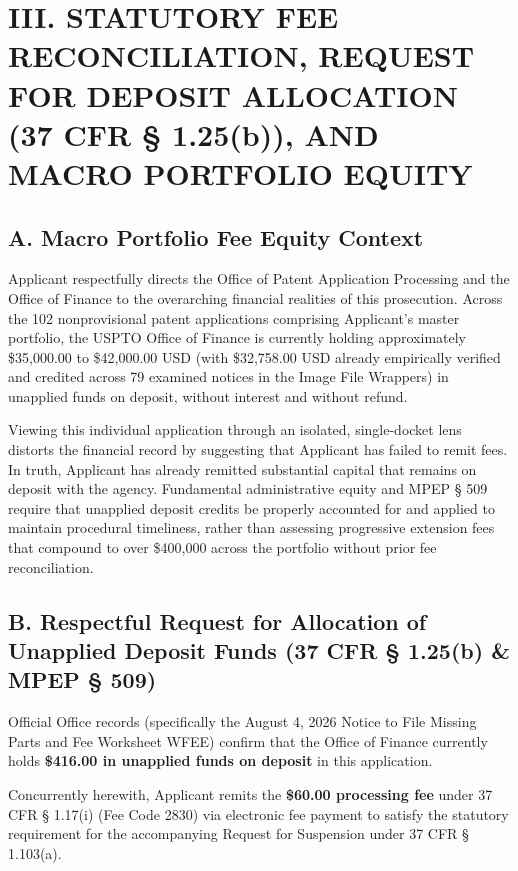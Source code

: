 \documentclass[11pt,letterpaper]{article}
\begin{document}
\section*{III. STATUTORY FEE RECONCILIATION, REQUEST FOR DEPOSIT ALLOCATION (37 CFR \S{} 1.25(b)), AND MACRO PORTFOLIO EQUITY}

\subsection*{A. Macro Portfolio Fee Equity Context}
Applicant respectfully directs the Office of Patent Application Processing and the Office of Finance to the overarching financial realities of this prosecution. Across the 102 nonprovisional patent applications comprising Applicant's master portfolio, the USPTO Office of Finance is currently holding approximately \$35,000.00 to \$42,000.00 USD (with \$32,758.00 USD already empirically verified and credited across 79 examined notices in the Image File Wrappers) in unapplied funds on deposit, without interest and without refund.

Viewing this individual application through an isolated, single-docket lens distorts the financial record by suggesting that Applicant has failed to remit fees. In truth, Applicant has already remitted substantial capital that remains on deposit with the agency. Fundamental administrative equity and MPEP \S{} 509 require that unapplied deposit credits be properly accounted for and applied to maintain procedural timeliness, rather than assessing progressive extension fees that compound to over \$400,000 across the portfolio without prior fee reconciliation.

\subsection*{B. Respectful Request for Allocation of Unapplied Deposit Funds (37 CFR \S{} 1.25(b) \& MPEP \S{} 509)}
Official Office records (specifically the August 4, 2026 Notice to File Missing Parts and Fee Worksheet WFEE) confirm that the Office of Finance currently holds \textbf{\$416.00 in unapplied funds on deposit} in this application.

Concurrently herewith, Applicant remits the \textbf{\$60.00 processing fee} under 37 CFR \S{} 1.17(i) (Fee Code 2830) via electronic fee payment to satisfy the statutory requirement for the accompanying Request for Suspension under 37 CFR \S{} 1.103(a).
\end{document}
